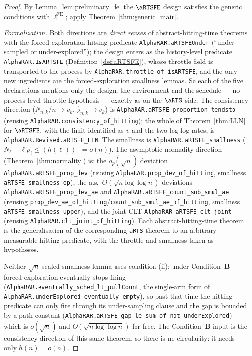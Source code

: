 \begin{proof}
By Lemma~\ref{lem:preliminary_fe} the $\aRTSFE$ design satisfies the generic
conditions with $\ell^{\mathrm{FE}}$; apply Theorem~\ref{thm:generic_main}.

\emph{Formalization.} Both directions are \emph{direct reuses} of abstract-hitting-time theorems
with the forced-exploration hitting predicate \texttt{AlphaRAR.aRTSFEUnder}
(``under-sampled or under-explored''); the design enters as the history-level predicate
\texttt{AlphaRAR.IsARTSFE} (Definition~\ref{def:aRTSFE}), whose throttle field is transported to
the process by \texttt{AlphaRAR.throttle\_of\_isARTSFE}, and the only new ingredients are the
forced-exploration smallness lemmas. So each of the five declarations mentions only the design, the
environment and the schedule --- no process-level throttle hypothesis --- exactly as on the
$\aRTS$ side. The consistency direction
($N_{n,k}/n\to v_k$, $\hat\rho_{n,k}\to v_k$) is \texttt{AlphaRAR.aRTSFE\_proportion\_tendsto}
(reusing \texttt{AlphaRAR.consistency\_of\_hitting}); the whole of Theorem~\ref{thm:LLN} for
$\aRTSFE$, with the limit identified as $v$ and the two log-log rates, is
\texttt{AlphaRAR.Revised.aRTSFE\_LLN}. The smallness is
\texttt{AlphaRAR.aRTSFE\_smallness} ($N_\ell-\ell\hat\rho_\ell\le(h(\ell))^+=o(n)$). The
asymptotic-normality direction (Theorem~\ref{thm:normality}) is: the $o_p(\sqrt n)$ deviation
\texttt{AlphaRAR.aRTSFE\_prop\_dev} (reusing \texttt{AlphaRAR.prop\_dev\_of\_hitting}, smallness
\texttt{aRTSFE\_smallness\_op}), the a.s.\ $O(\sqrt{n\log\log n})$ deviations
\texttt{AlphaRAR.aRTSFE\_prop\_dev\_ae} and \texttt{AlphaRAR.aRTSFE\_count\_sub\_smul\_ae} (reusing
\texttt{prop\_dev\_ae\_of\_hitting}/\texttt{count\_sub\_smul\_ae\_of\_hitting}, smallness
\texttt{aRTSFE\_smallness\_upper}), and the joint CLT \texttt{AlphaRAR.aRTSFE\_clt\_joint} (reusing
\texttt{AlphaRAR.clt\_joint\_of\_hitting}). Each abstract-hitting-time theorem is the generalisation
of the corresponding \texttt{aRTS} theorem to an arbitrary measurable hitting predicate, with the
throttle and smallness taken as hypotheses.

Neither $\sqrt n$-scaled smallness lemma uses condition (ii): under Condition~\textbf{B} forced
exploration eventually stops firing (\texttt{AlphaRAR.eventually\_sched\_lt\_pullCount}, the single-arm
form of \texttt{AlphaRAR.underExplored\_eventually\_empty}), so past that time the hitting predicate
can only fire through its under-sampling clause and the gap is bounded by a path constant
(\texttt{AlphaRAR.aRTSFE\_gap\_le\_sum\_of\_not\_underExplored}) --- which is $o(\sqrt n)$ and
$O(\sqrt{n\log\log n})$ for free. The Condition~\textbf{B} input is the consistency direction of
this same theorem, so there is no circularity: it needs only $h(n)=o(n)$.
\end{proof}

